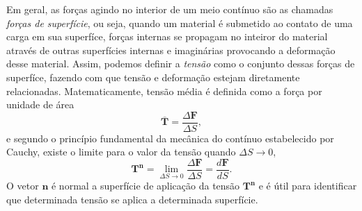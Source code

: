 Em geral, as for\c{c}as agindo no interior de um meio cont\'inuo s\~ao as chamadas \textit{for\c{c}as de superf\'icie}, ou seja, quando um material \'e submetido ao contato de uma carga em sua superf\'ice, for\c{c}as internas se propagam no inteiror do material atrav\'es de outras superf\'icies internas e imagin\'arias provocando a deforma\c{c}\~ao desse material. Assim, podemos definir a \textit{tens\~ao} como o conjunto dessas for\c{c}as de superf\'ice, fazendo com que tens\~ao e deforma\c{c}\~ao estejam diretamente relacionadas. Matematicamente, tens\~ao m\'edia \'e definida como a for\c{c}a por unidade de \'area
\begin{equation}\label{eq.tensao_media}
\mathbf{\overline{T}}=\frac{\Delta\mathbf{F}}{\Delta S},
\end{equation}
e segundo o princ\'ipio fundamental da mec\^anica do cont\'inuo estabelecido por Cauchy, existe o limite para o valor da tens\~ao quando $\Delta S\to 0$,
\begin{equation*}
\mathbf{T}^{\mathbf{n}}=\lim_{\Delta S\to 0}\frac{\Delta\mathbf{F}}{\Delta S}=\frac{d\mathbf{F}}{dS}.
\end{equation*}
O vetor $\mathbf{n}$ \'e normal a superf\'icie de aplica\c{c}\~ao da tens\~ao $\mathbf{T}^{\mathbf{n}}$ e \'e \'util para identificar que determinada tens\~ao se aplica a determinada superf\'icie.

